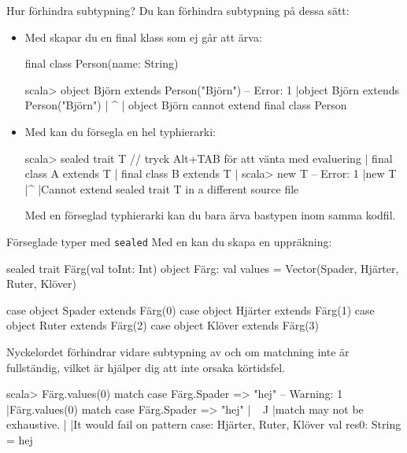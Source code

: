 \begin{Slide}{Hur förhindra subtypning?}
Du kan förhindra subtypning på dessa sätt:  
\begin{itemize}
\item Med  skapar du en final klass som ej går att ärva:
\begin{Code}
final class Person(name: String)
\end{Code}   
\begin{REPLsmall}
scala> object Björn extends Person("Björn")
-- Error:
1 |object Björn extends Person("Björn")
  |       ^
  |       object Björn cannot extend final class Person

\end{REPLsmall}
\item Med  kan du försegla en hel typhierarki:
\begin{REPLsmall}
scala> sealed trait T  // tryck Alt+TAB för att vänta med evaluering
     | final class A extends T
     | final class B extends T
     |
scala> new T{}
-- Error:
1 |new T{}
|^
|Cannot extend sealed trait T in a different source file
\end{REPLsmall}
Med en förseglad typhierarki kan du bara ärva bastypen inom samma kodfil. 
\end{itemize}
\end{Slide}


\begin{Slide}{Förseglade typer med \texttt{sealed}}\SlideFontSmall
Med en  kan du skapa en  uppräkning:
\begin{Code}
sealed trait Färg(val toInt: Int)
object Färg:
  val values = Vector(Spader, Hjärter, Ruter, Klöver)
  
  case object Spader  extends Färg(0)
  case object Hjärter extends Färg(1)
  case object Ruter   extends Färg(2)
  case object Klöver  extends Färg(3)
\end{Code}
Nyckelordet  förhindrar vidare subtypning av  och  om matchning inte är fullständig, vilket är hjälper dig att inte orsaka körtidsfel.

\begin{REPL}
scala> Färg.values(0) match { case Färg.Spader => "hej" }
-- Warning:
1 |Färg.values(0) match { case Färg.Spader => "hej" }
  |^^^^^^^^^^^^^^
  |match may not be exhaustive.
  |
  |It would fail on pattern case: Hjärter, Ruter, Klöver
val res0: String = hej
\end{REPL}
\end{Slide}
  
